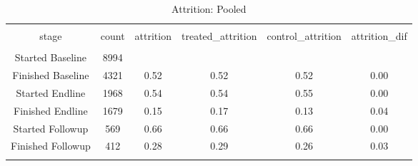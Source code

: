 
\begin{table}[H] \centering 
  \caption{Attrition: Pooled} 
  \label{tbl:Attrition: Pooled} 
\begin{tabular}{@{\extracolsep{5pt}} cccccc} 
\\[-1.8ex]\hline 
\hline \\[-1.8ex] 
stage & count & attrition & treated\_attrition & control\_attrition & attrition\_dif \\ 
\hline \\[-1.8ex] 
Started Baseline & 8994 &  &  &  &  \\ 
Finished Baseline & 4321 & 0.52 & 0.52 & 0.52 & 0.00 \\ 
Started Endline & 1968 & 0.54 & 0.54 & 0.55 & 0.00 \\ 
Finished Endline & 1679 & 0.15 & 0.17 & 0.13 & 0.04 \\ 
Started Followup &  569 & 0.66 & 0.66 & 0.66 & 0.00 \\ 
Finished Followup &  412 & 0.28 & 0.29 & 0.26 & 0.03 \\ 
\hline \\[-1.8ex] 
\end{tabular} 
\end{table} 
